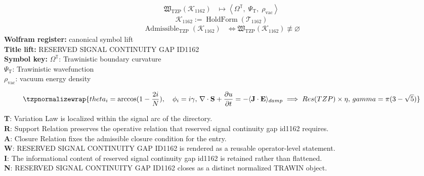 \noindent
\begin{minipage}[t]{0.48\linewidth}
\begingroup
\small
\[
\begin{aligned}
\mathfrak{W}_{\mathrm{TZP}}\!\left(\mathcal{K}_{1162}\right)
&\longmapsto
\left\langle \Omega^{\mathbb{T}},\; \Psi_{\mathrm{T}},\; \rho_{\mathrm{vac}} \right\rangle
\end{aligned}
\]
\[
\mathcal{K}_{1162}
:=
\operatorname{HoldForm}\!\left(\mathcal{T}_{1162}\right)
\]
\[
\begin{aligned}
\operatorname{Admissible}_{\mathrm{TZP}}\!\left(\mathcal{K}_{1162}\right)
&\Longleftrightarrow
\mathfrak{W}_{\mathrm{TZP}}\!\left(\mathcal{K}_{1162}\right)\not\equiv\varnothing
\end{aligned}
\]
\textbf{Wolfram register:} canonical symbol lift\\
\textbf{Title lift:} RESERVED SIGNAL CONTINUITY GAP ID1162\\
\textbf{Symbol key:} \(\Omega^{\mathbb{T}}\): Trawinistic boundary curvature\\ \(\Psi_{\mathrm{T}}\): Trawinistic wavefunction\\ \(\rho_{\mathrm{vac}}\): vacuum energy density
\par
\endgroup
\end{minipage}\hfill
\begin{minipage}[t]{0.48\linewidth}
\[
\tzpnormalizewrap{theta_i = \arccos(1 - \frac{2i}{N}), \quad \phi_i = i\gamma,\,\nabla \cdot \mathbf{S} + \frac{\partial u}{\partial t} = -\langle \mathbf{J} \cdot \mathbf{E} \rangle_{damp} \implies Res(TZP) \times \eta,\,gamma = \pi(3-\sqrt{5})}
\]

\small
\textbf{T}: Variation Law is localized within the signal arc of the directory.\\
\textbf{R}: Support Relation preserves the operative relation that reserved signal continuity gap id1162 requires.\\
\textbf{A}: Closure Relation fixes the admissible closure condition for the entry.\\
\textbf{W}: RESERVED SIGNAL CONTINUITY GAP ID1162 is rendered as a reusable operator-level statement.\\
\textbf{I}: The informational content of reserved signal continuity gap id1162 is retained rather than flattened.\\
\textbf{N}: RESERVED SIGNAL CONTINUITY GAP ID1162 closes as a distinct normalized TRAWIN object.
\normalsize
\end{minipage}

